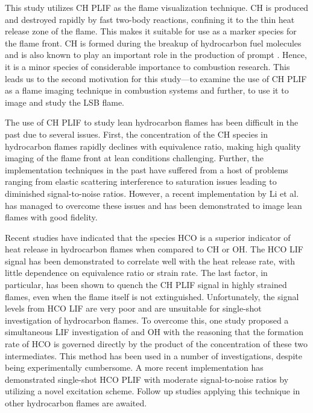 This study utilizes CH PLIF as the flame visualization technique.
CH is produced and destroyed rapidly by fast two-body reactions, confining it to the thin heat release zone of the flame.
This makes it suitable for use as a marker species for the flame front.\cite{2005-vagelopoulos}
CH is formed during the breakup of hydrocarbon fuel molecules\cite{2010-kohler} and is also known to play an important role in the production of prompt .\cite{1971-fenimore}
Hence, it is a minor species of considerable importance to combustion research.
This leads us to the second motivation for this study---to examine the use of CH PLIF as a flame imaging technique in combustion systems and further, to use it to image and study the LSB flame.

The use of CH PLIF to study lean hydrocarbon flames has been difficult in the past due to several issues.
First, the concentration of the CH species in hydrocarbon flames rapidly declines with equivalence ratio, making high quality imaging of the flame front at lean conditions challenging.
Further, the implementation techniques in the past have suffered from a host of problems ranging from elastic scattering interference to saturation issues leading to diminished signal-to-noise ratios.
However, a recent implementation by Li et al.\cite{2007-li-a} has managed to overcome these issues and has been demonstrated to image lean flames with good fidelity.

Recent studies\cite{1998-najm} have indicated that the species HCO is a superior indicator of heat release in hydrocarbon flames when compared to CH or OH.
The HCO LIF signal has been demonstrated to correlate well with the heat release rate, with little dependence on equivalence ratio or strain rate.
The last factor, in particular, has been shown to quench the CH PLIF signal\cite{2008-kiefer} in highly strained flames, even when the flame itself is not extinguished.
Unfortunately, the signal levels from HCO LIF are very poor\cite{1998-najm,1998-paul} and are unsuitable for single-shot investigation of hydrocarbon flames.
To overcome this, one study\cite{1998-paul} proposed a simultaneous LIF investigation of  and OH with the reasoning that the formation rate of HCO is governed directly by the product of the concentration of these two intermediates.
This method has been used in a number of investigations,\cite{2006-ayoola} despite being experimentally cumbersome.
A more recent implementation\cite{2009-kiefer} has demonstrated single-shot HCO PLIF with moderate signal-to-noise ratios by utilizing a novel excitation scheme.
Follow up studies applying this technique in other hydrocarbon flames are awaited.

